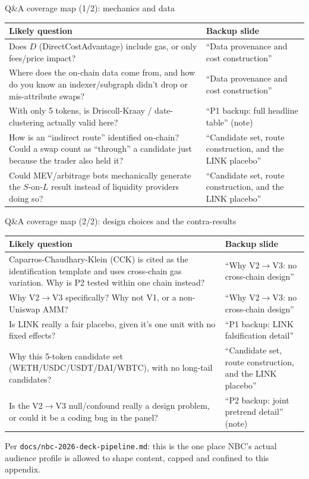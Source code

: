 \documentclass[aspectratio=169]{beamer}
\begin{document}
\begin{frame}{Q\&A coverage map (1/2): mechanics and data}
  \footnotesize
  \begin{center}
  \begin{tabular}{@{}p{5.6cm}p{5.9cm}@{}}
    \toprule
    Likely question & Backup slide \\
    \midrule
    Does $D$ (DirectCostAdvantage) include gas, or only fees/price impact? & ``Data provenance and cost construction'' \\[0.3em]
    Where does the on-chain data come from, and how do you know an indexer/subgraph didn't drop or mis-attribute swaps? & ``Data provenance and cost construction'' \\[0.3em]
    With only 5 tokens, is Driscoll-Kraay / date-clustering actually valid here? & ``P1 backup: full headline table'' (note) \\[0.3em]
    How is an ``indirect route'' identified on-chain? Could a swap count as ``through'' a candidate just because the trader also held it? & ``Candidate set, route construction, and the LINK placebo'' \\[0.3em]
    Could MEV/arbitrage bots mechanically generate the $S$-on-$L$ result instead of liquidity providers doing so? & ``Candidate set, route construction, and the LINK placebo'' \\
    \bottomrule
  \end{tabular}
  \end{center}
\end{frame}

\begin{frame}{Q\&A coverage map (2/2): design choices and the contra-results}
  \footnotesize
  \begin{center}
  \begin{tabular}{@{}p{5.6cm}p{5.9cm}@{}}
    \toprule
    Likely question & Backup slide \\
    \midrule
    Caparros-Chaudhary-Klein (CCK) is cited as the identification template and uses cross-chain gas variation. Why is P2 tested within one chain instead? & ``Why V2$\to$V3: no cross-chain design'' \\[0.3em]
    Why V2$\to$V3 specifically? Why not V1, or a non-Uniswap AMM? & ``Why V2$\to$V3: no cross-chain design'' \\[0.3em]
    Is LINK really a fair placebo, given it's one unit with no fixed effects? & ``P1 backup: LINK falsification detail'' \\[0.3em]
    Why this 5-token candidate set (WETH/USDC/USDT/DAI/WBTC), with no long-tail candidates? & ``Candidate set, route construction, and the LINK placebo'' \\[0.3em]
    Is the V2$\to$V3 null/confound really a design problem, or could it be a coding bug in the panel? & ``P2 backup: joint pretrend detail'' (note) \\
    \bottomrule
  \end{tabular}
  \end{center}
  {\scriptsize Per \texttt{docs/nbc-2026-deck-pipeline.md}: this is the one place NBC's actual audience profile is allowed to shape content, capped and confined to this appendix.}
\end{frame}
\end{document}
